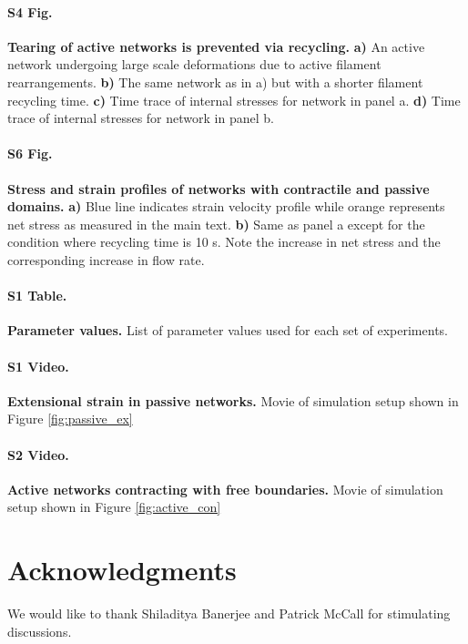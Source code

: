 \documentclass[10pt,letterpaper]{article}
\begin{document}
\paragraph*{S4 Fig.}
\label{fig:tear_supp}
{\bf  Tearing of active networks is prevented via recycling. } \textbf{a)}  An active network undergoing large scale deformations due to active filament rearrangements.  \textbf{b)}  The same network as in a) but with a shorter filament recycling time.  \textbf{c)}  Time trace of internal stresses for network in panel a.  \textbf{d)}   Time trace of internal stresses for network in panel b. 

\paragraph*{S6 Fig.}
\label{fig:combo_prof}
{\bf Stress and strain profiles of networks with contractile and passive domains.}    \textbf{a)} Blue line indicates strain velocity profile while orange represents net stress as measured in the main text. \textbf{b)} Same as panel a except for the condition where recycling time is 10 s.  Note the increase in net stress and the corresponding increase in flow rate. 

\paragraph*{S1 Table.}
\label{S1_Table}
{\bf Parameter values.}  List of parameter values used for each set of experiments.

\paragraph*{S1 Video.}
\label{passive_ex_video}
{\bf Extensional strain in passive networks.}  Movie of simulation setup shown in Figure \ref{fig:passive_ex}

\paragraph*{S2 Video.}
\label{active_con_video}
{\bf Active networks contracting with free boundaries.}  Movie of simulation setup shown in Figure \ref{fig:active_con}

\section*{Acknowledgments}
We would like to thank Shiladitya Banerjee and Patrick McCall for stimulating discussions.

\nolinenumbers

% 


\end{document}
